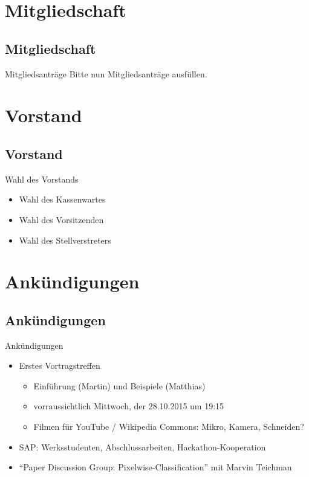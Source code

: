 \section{Mitgliedschaft}\subsection*{Mitgliedschaft}
\begin{frame}{Mitgliedsanträge}
    Bitte nun Mitgliedsanträge ausfüllen.
\end{frame}

\section{Vorstand}\subsection*{Vorstand}
\begin{frame}{Wahl des Vorstands}
    \begin{itemize}
        \item Wahl des Kassenwartes
        \item Wahl des Vorsitzenden
        \item Wahl des Stellverstreters
    \end{itemize}
\end{frame}

\section{Ankündigungen}\subsection*{Ankündigungen}
\begin{frame}{Ankündigungen}
    \begin{itemize}
        \item Erstes Vortragstreffen
              \begin{itemize}
                  \item Einführung (Martin) und Beispiele (Matthias)
                  \item vorraussichtlich Mittwoch, der 28.10.2015 um 19:15
                  \item Filmen für YouTube / Wikipedia Commons: Mikro, Kamera, Schneiden?
              \end{itemize}
        \item SAP: Werksstudenten, Abschlussarbeiten, Hackathon-Kooperation
        \item \enquote{Paper Discussion Group: Pixelwise-Classification} mit
              Marvin Teichman
    \end{itemize}
\end{frame}